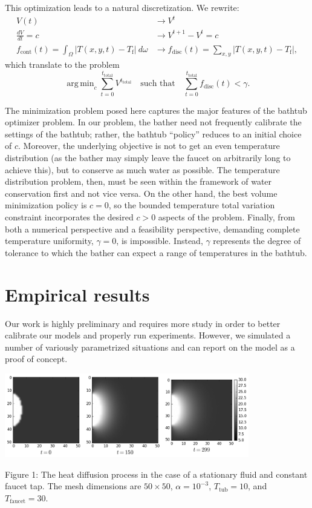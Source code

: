 \documentclass[12pt]{article}
\newcommand{\abs}[1]{\left|#1\right|}
\DeclareMathOperator*{\argmin}{\mathrm{arg\,min}}
\begin{document}
This optimization leads to a natural discretization. We rewrite:
\begin{align}
    V(t) &\longrightarrow V^t \\
    \frac{dV}{dt} = c &\longrightarrow V^{t+1} - V^t = c \\
    f_{\mathrm{cont}}(t) = \int_{\Omega} \abs{T(x,y,t) - T_{\mathrm{f}}} \
    d\omega &\longrightarrow f_{\mathrm{disc}}(t) = \sum_{x,y}\abs{T(x,y,t) -
        T_{\mathrm{f}}},
\end{align}
which translate to the problem
\begin{equation}
    \argmin_{c} \sum_{t=0}^{t_{\mathrm{total}}}V^{t_{\mathrm{total}}} \quad \text{such that} \quad
    \sum_{t=0}^{t_{\mathrm{total}}} f_{\mathrm{disc}}(t) < \gamma.
    \label{eq:\theequation}
\end{equation}

The minimization problem posed here captures the major features of the bathtub
optimizer problem. In our problem, the bather need not frequently calibrate the
settings of the bathtub; rather, the bathtub ``policy'' reduces to an initial
choice of $c$. Moreover, the underlying objective is not to get an even temperature
distribution (as the bather may simply leave the faucet on arbitrarily long to
achieve this), but to conserve as much water as possible. The temperature
distribution problem, then, must be seen within the framework of water
conservation first and not vice versa. On the other hand, the best volume
minimization policy is $c=0$, so the bounded temperature total variation
constraint incorporates the desired $c > 0$ aspects of the problem. Finally,
from both a numerical perspective and a feasibility perspective, demanding
complete temperature uniformity, $\gamma = 0$, is impossible. Instead, $\gamma$
represents the degree of tolerance to which the bather can expect a range of
temperatures in the bathtub.

\section{Empirical results}

Our work is highly preliminary and requires more study in order to better
calibrate our models and properly run experiments. However, we simulated a
number of variously parametrized situations and can report on the model as a
proof of concept.

\begin{center}
\includegraphics[width=0.8\textwidth]{../plots/diffusion.png}

Figure 1: The heat diffusion process in the case of a stationary fluid and
constant faucet tap. The mesh
dimensions are $50 \times 50$, $\alpha = 10^{-3}$, $T_{\mathrm{tub}} = 10$, and
$T_{\mathrm{faucet}} = 30$.
\end{center}
\end{document}
